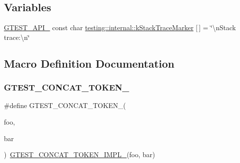 \subsection*{Variables}
\begin{DoxyCompactItemize}
\item 
\mbox{\hyperlink{_obj__test_2lib_2googletest-release-1_88_81_2googletest_2include_2gtest_2internal_2gtest-port_8h_aa73be6f0ba4a7456180a94904ce17790}{G\+T\+E\+S\+T\+\_\+\+A\+P\+I\+\_\+}} const char \mbox{\hyperlink{namespacetesting_1_1internal_abb38528ca6a45df265b19f5ccb3d16d9}{testing\+::internal\+::k\+Stack\+Trace\+Marker}} \mbox{[}$\,$\mbox{]} = \char`\"{}\textbackslash{}n\+Stack trace\+:\textbackslash{}n\char`\"{}
\end{DoxyCompactItemize}


\subsection{Macro Definition Documentation}
\mbox{\label{googletest-master_2googletest_2include_2gtest_2internal_2gtest-internal_8h_ae3c336cbe1ae2bd1b1d019333e4428a0}} 
\subsubsection{\texorpdfstring{GTEST\_CONCAT\_TOKEN\_}{GTEST\_CONCAT\_TOKEN\_}}
{\footnotesize\ttfamily \#define G\+T\+E\+S\+T\+\_\+\+C\+O\+N\+C\+A\+T\+\_\+\+T\+O\+K\+E\+N\+\_\+(\begin{DoxyParamCaption}\item[{}]{foo,  }\item[{}]{bar }\end{DoxyParamCaption})~\mbox{\hyperlink{_obj__test_2lib_2googletest-release-1_88_81_2googletest_2include_2gtest_2internal_2gtest-internal_8h_aa39fb5346d3573feebe4257cb3a01fde}{G\+T\+E\+S\+T\+\_\+\+C\+O\+N\+C\+A\+T\+\_\+\+T\+O\+K\+E\+N\+\_\+\+I\+M\+P\+L\+\_\+}}(foo, bar)}

\mbox{\label{googletest-master_2googletest_2include_2gtest_2internal_2gtest-internal_8h_aa39fb5346d3573feebe4257cb3a01fde}} 
